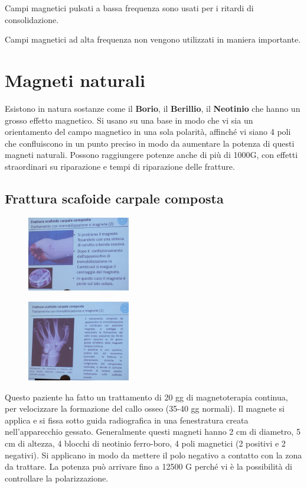Campi magnetici pulsati a bassa frequenza sono usati per i ritardi di
consolidazione.

Campi magnetici ad alta frequenza non vengono utilizzati in maniera
importante.

\section{Magneti naturali}

Esistono in natura sostanze come il \textbf{Borio}, il
\textbf{Berillio}, il \textbf{Neotinio} che hanno un grosso effetto
magnetico. Si usano su una base in modo che vi sia un orientamento del
campo magnetico in una sola polarità, affinché vi siano 4 poli che
confluiscono in un punto preciso in modo da aumentare la potenza di
questi magneti naturali. Possono raggiungere potenze anche di più di
1000G, con effetti straordinari su riparazione e tempi di riparazione
delle fratture.

\subsection{Frattura scafoide carpale composta}

\begin{figure}[!ht]
\centering
\includegraphics[width=0.4\textwidth]{026/image3.jpeg}
\end{figure}

\begin{figure}[!ht]
\centering
\includegraphics[width=0.4\textwidth]{026/image4.jpeg}
\end{figure}

Questo
paziente ha fatto un trattamento di 20 gg di magnetoterapia continua,
per velocizzare la formazione del callo osseo (35-40 gg normali). Il
magnete si applica e si fissa sotto guida radiografica in una
fenestratura creata nell'apparecchio gessato. Generalmente questi
magneti hanno 2 cm di diametro, 5 cm di altezza, 4 blocchi di neotinio
ferro-boro, 4 poli magnetici (2 positivi e 2 negativi). Si applicano in
modo da mettere il polo negativo a contatto con la zona da trattare. La
potenza può arrivare fino a 12500 G perché vi è la possibilità di
controllare la polarizzazione.

